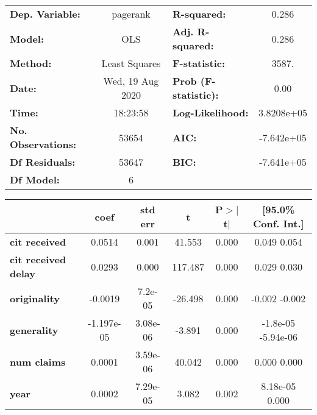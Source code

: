\begin{center}
\begin{tabular}{lclc}
\toprule
\textbf{Dep. Variable:}     &     pagerank     & \textbf{  R-squared:         } &      0.286    \\
\textbf{Model:}             &       OLS        & \textbf{  Adj. R-squared:    } &      0.286    \\
\textbf{Method:}            &  Least Squares   & \textbf{  F-statistic:       } &      3587.    \\
\textbf{Date:}              & Wed, 19 Aug 2020 & \textbf{  Prob (F-statistic):} &      0.00     \\
\textbf{Time:}              &     18:23:58     & \textbf{  Log-Likelihood:    } &  3.8208e+05   \\
\textbf{No. Observations:}  &       53654      & \textbf{  AIC:               } &  -7.642e+05   \\
\textbf{Df Residuals:}      &       53647      & \textbf{  BIC:               } &  -7.641e+05   \\
\textbf{Df Model:}          &           6      & \textbf{                     } &               \\
\bottomrule
\end{tabular}
\begin{tabular}{lccccc}
                            & \textbf{coef} & \textbf{std err} & \textbf{t} & \textbf{P$>$$|$t$|$} & \textbf{[95.0\% Conf. Int.]}  \\
\midrule
\textbf{cit received}       &       0.0514  &        0.001     &    41.553  &         0.000        &         0.049     0.054       \\
\textbf{cit received delay} &       0.0293  &        0.000     &   117.487  &         0.000        &         0.029     0.030       \\
\textbf{originality}        &      -0.0019  &      7.2e-05     &   -26.498  &         0.000        &        -0.002    -0.002       \\
\textbf{generality}         &   -1.197e-05  &     3.08e-06     &    -3.891  &         0.000        &      -1.8e-05 -5.94e-06       \\
\textbf{num claims}         &       0.0001  &     3.59e-06     &    40.042  &         0.000        &         0.000     0.000       \\
\textbf{year}               &       0.0002  &     7.29e-05     &     3.082  &         0.002        &      8.18e-05     0.000       \\
\bottomrule

\end{tabular}
\end{center}
